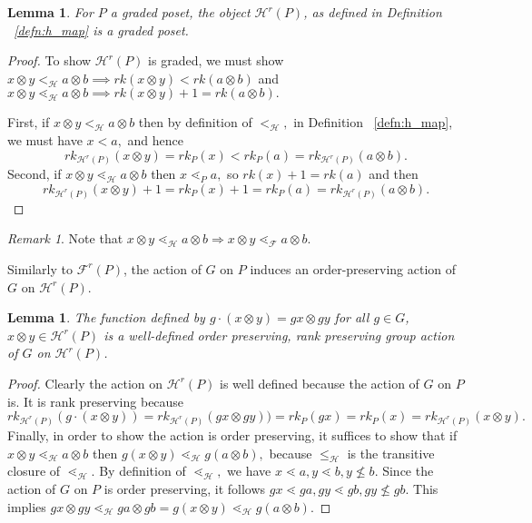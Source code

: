 \documentclass{amsart}
\newtheorem{lem}[thm]{Lemma}
\theoremstyle{remark}
\newtheorem{rem}[thm]{Remark}
\begin{document}
\begin{lem}\label{lem:HP_order}
For $P$ a graded poset, the object $\mathcal{H}^r(P)$, as defined in Definition ~\ref{defn:h_map} is a graded poset.
\end{lem}
\begin{proof}
To show $\mathcal H^r(P)$ is graded, we must show $x\otimes y <_{\mathcal H} a \otimes b \implies rk(x\otimes y)<rk(a \otimes b)$ and $x\otimes y \lessdot_{\mathcal H} a \otimes b \implies rk(x\otimes y)+1 = rk(a \otimes b).$ 

First, if $x\otimes y <_{\mathcal H} a \otimes b$ then by definition of $<_{\mathcal H},$ in Definition ~\ref{defn:h_map}, we must have $x < a,$ and hence 
$$rk_{\mathcal H^r(P)}(x\otimes y) = rk_P(x)<rk_P(a) = rk_{\mathcal H^r(P)}(a\otimes b).$$
Second, if $x\otimes y \lessdot_{\mathcal H} a \otimes b$ then $x \lessdot_P a,$ so $rk(x)+1 = rk(a)$ and then $$rk_{\mathcal H^r(P)}(x\otimes y)+1 = rk_P(x) +1=rk_P(a)= rk_{\mathcal H^r(P)}(a\otimes b).$$
\end{proof}

\begin{rem}\label{rem:order_containment}
Note that $x\otimes y\lessdot_{\mathcal{H}} a\otimes b \Rightarrow x\otimes y\lessdot_{\mathcal{F}} a\otimes b$.
\end{rem}

Similarly to $\mathcal{F}^r(P)$, the action of $G$ on $P$ induces an order-preserving action of $G$ on $\mathcal{H}^r(P)$.

\begin{lem}
\label{lem:G_action_on_HP}
The function defined by $g\cdot (x\otimes y)= gx\otimes gy$ for all $g\in G$, $x\otimes y\in \mathcal{H}^r(P)$ is a well-defined order preserving, rank preserving group action of $G$ on $\mathcal{H}^r(P)$.
\end{lem}

\begin{proof}
Clearly the action on $\mathcal H^r(P)$ is well defined because the action of $G$ on $P$ is. It is rank preserving because $$rk_{\mathcal H^r(P)}(g\cdot(x\otimes y)) = rk_{\mathcal H^r(P)}(gx\otimes gy)) = rk_P(gx)=rk_P(x) = rk_{\mathcal H^r(P)}(x\otimes y).$$
Finally, in order to show the action is order preserving, it suffices to show that if $x\otimes y \lessdot_{\mathcal H} a \otimes b$ then $g(x\otimes y) \lessdot_{\mathcal H} g(a \otimes b),$ because $\leq_{\mathcal H}$ is the transitive closure of $\lessdot_{\mathcal H}.$ By definition of $\lessdot_{\mathcal H},$ we have $x \lessdot a,y\lessdot b,y \not \leq b.$ Since the action of $G$ on $P$ is order preserving, it follows $gx \lessdot ga,gy \lessdot gb, gy \not \leq gb.$ This implies $gx\otimes gy \lessdot_{\mathcal H} ga \otimes gb = g(x\otimes y) \lessdot_{\mathcal H} g(a \otimes b).$
\end{proof}
\end{document}
